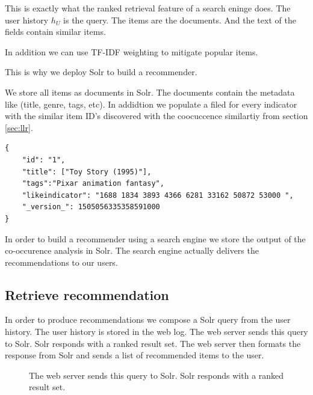 This is exactly what the ranked retrieval feature of a search eninge does.
The user history $h_U$ is the query. The items are the documents. And the text of the fields contain similar items.

In addition we can use TF-IDF \cite{Manning} weighting to mitigate popular items.

This is why we deploy Solr to build a recommender.

We store all items as documents in Solr. The documents contain the metadata like (title, genre, tags, etc). In addidtion we populate a filed for every indicator with the similar item ID's discovered with the coocuccence similartiy from section \ref{sec:llr}.

\begin{lstlisting}[caption={Item metadata and similar items are stored in Solr.},label={lst:solrdoc}]
{
    "id": "1",
    "title": ["Toy Story (1995)"],
    "tags":"Pixar animation fantasy",
    "likeindicator": "1688 1834 3893 4366 6281 33162 50872 53000 ",
    "_version_": 1505056335358591000
}
\end{lstlisting}

In order to build a recommender using a search engine we store the output of the co-occurence analysis in Solr. The search engine actually delivers the recommendations to our users.

\subsection{Retrieve recommendation}

In order to produce recommendations we compose a Solr query from the user history. The user history is stored in the web log. The web server sends this query to Solr. Solr responds with a ranked result set. The web server then formats the response from Solr and sends a list of recommended items to the user.

\begin{figure}
\centering
{}
\caption{The web server sends this query to Solr. Solr responds with a ranked result set.}
\end{figure}


